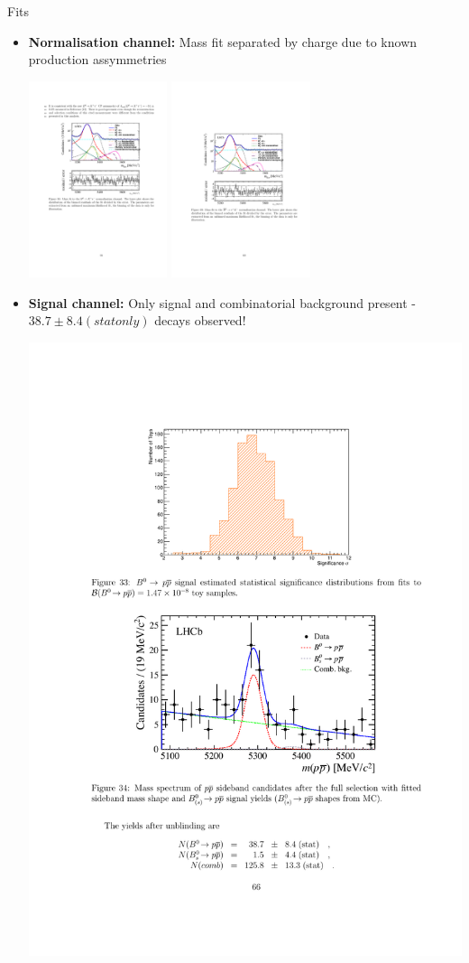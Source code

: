 \documentclass{beamer}
\begin{document}
\begin{frame}{Fits}
  \small
  \begin{itemize}
  \item \textbf{Normalisation channel:} Mass fit separated by charge due to known production assymmetries
  \begin{center}
    \includegraphics[width=0.32\textwidth]{PPNormMassFit.pdf}
    \includegraphics[width=0.32\textwidth]{PPNormMassFitBar.pdf}
  \end{center}
  \item \textbf{Signal channel:} Only signal and combinatorial background present - $38.7\pm8.4(stat only)$ \decay{\Bd}{\proton\antiproton} decays observed!
    \begin{center}
      \includegraphics[width=.4\textwidth]{PPSignalMassFit.pdf}
    \end{center}
  \end{itemize}
\end{frame}
\end{document}
